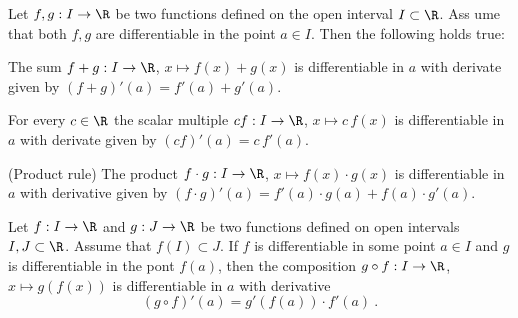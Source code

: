 \begin{proposition}
  Let $f,g:I \to \R$ be two functions defined on the open interval 
  $I \subset \R$. Ass ume that both $f,g$ are differentiable in the point 
  $a\in I$. Then the following holds true:
  \begin{letterlist}
  \item The sum $f+g :I \to \R$, $x \mapsto f(x)+g(x)$
        is differentiable in $a$ with derivate  given by 
        $(f+g)'(a)=f'(a)+g'(a)$. 
  \item For every $c\in \R$  the scalar multiple 
        $cf :I \to \R$, $x \mapsto c \, f(x)$
        is differentiable in $a$ with derivate  given by 
        $(cf)'(a)=c\, f'(a)$. 
  \item \textup{(}Product rule\textup{)}
        The product $f \cdot g :I \to \R$, $x \mapsto f(x)\cdot g(x)$
        is differentiable in $a$ with derivative  given by 
        $(f\cdot g)'(a)=f'(a) \cdot g(a) + f(a) \cdot g'(a)$.
  \end{letterlist}
\end{proposition}

\begin{proposition}
  Let $f:I \to \R$ and $g:J \to \R $ be two functions defined on open intervals 
  $I,J \subset \R$. Assume that $f(I) \subset J$.            
  If $f$ is differentiable in some point $a \in I$ and $g$ is differentiable 
  in the pont $f(a)$, then the composition 
  $g\circ f : I \to \R$, $x \mapsto g(f(x))$ is differentiable in $a$ with
  derivative 
  \[
    (g\circ f)'(a) = g'(f(a)) \cdot f'(a) \ . 
  \]
\end{proposition}


